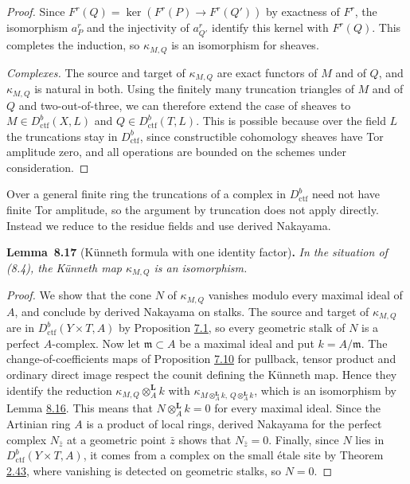 \documentclass[11pt]{article}
\newenvironment{bpstatement}[2]{\par\addvspace{0.6\baselineskip}\noindent\textbf{#1}#2\textbf{.}\enspace\ignorespaces}
  {\par\addvspace{0.4\baselineskip}}
\newenvironment{bpstatementit}[2]{\begin{bpstatement}{#1}{#2}\itshape\ignorespaces}{\end{bpstatement}}
\begin{document}
\begin{proof}[{Proof}]
Since \(F^r(Q)=\ker(F^r(P)\to F^r(Q'))\) by exactness of \(F^r\), the isomorphism \(a_P^r\) and the injectivity of \(a_{Q'}^r\) identify this kernel with \(F^r(Q)\). This completes the induction, so \(\kappa_{M,Q}\) is an isomorphism for sheaves.

\emph{Complexes.} The source and target of \(\kappa_{M,Q}\) are exact functors of \(M\) and of \(Q\), and \(\kappa_{M,Q}\) is natural in both. Using the finitely many truncation triangles of \(M\) and of \(Q\) and two-out-of-three, we can therefore extend the case of sheaves to \(M\in D^b_{\mathrm{ctf}}(X,L)\) and \(Q\in D^b_{\mathrm{ctf}}(T,L)\). This is possible because over the field \(L\) the truncations stay in \(D^b_{\mathrm{ctf}}\), since constructible cohomology sheaves have Tor amplitude zero, and all operations are bounded on the schemes under consideration.
\end{proof}

\label{bp697}%
Over a general finite ring the truncations of a complex in \(D^b_{\mathrm{ctf}}\) need not have finite Tor amplitude, so the argument by truncation does not apply directly. Instead we reduce to the residue fields and use derived Nakayama.

\label{bp698}%
\begin{bpstatementit}{Lemma~8.17}{ (Künneth formula with one identity factor)}
In the situation of (8.4), the Künneth map \(\kappa_{M,Q}\) is an isomorphism.
\end{bpstatementit}

\begin{proof}[{Proof}]\label{bp699}%
We show that the cone \(N\) of \(\kappa_{M,Q}\) vanishes modulo every maximal ideal of \(A\), and conclude by derived Nakayama on stalks. The source and target of \(\kappa_{M,Q}\) are in \(D^b_{\mathrm{ctf}}(Y\times T,A)\) by Proposition \hyperref[bp605]{7.1}, so every geometric stalk of \(N\) is a perfect \(A\)-complex. Now let \(\mathfrak m\subset A\) be a maximal ideal and put \(k=A/\mathfrak m\). The change-of-coefficients maps of Proposition \hyperref[bp626]{7.10} for pullback, tensor product and ordinary direct image respect the counit defining the Künneth map. Hence they identify the reduction \(\kappa_{M,Q}\otimes^{\mathbf L}_A k\) with \(\kappa_{M\otimes^{\mathbf L}_Ak,\,Q\otimes^{\mathbf L}_Ak}\), which is an isomorphism by Lemma \hyperref[bp695]{8.16}. This means that \(N\otimes^{\mathbf L}_A k=0\) for every maximal ideal. Since the Artinian ring \(A\) is a product of local rings, derived Nakayama for the perfect complex \(N_{\bar z}\) at a geometric point \(\bar z\) shows that \(N_{\bar z}=0\). Finally, since \(N\) lies in \(D^b_{\mathrm{ctf}}(Y\times T,A)\), it comes from a complex on the small étale site by Theorem \hyperref[bp129]{2.43}, where vanishing is detected on geometric stalks, so \(N=0\).
\end{proof}
\end{document}
